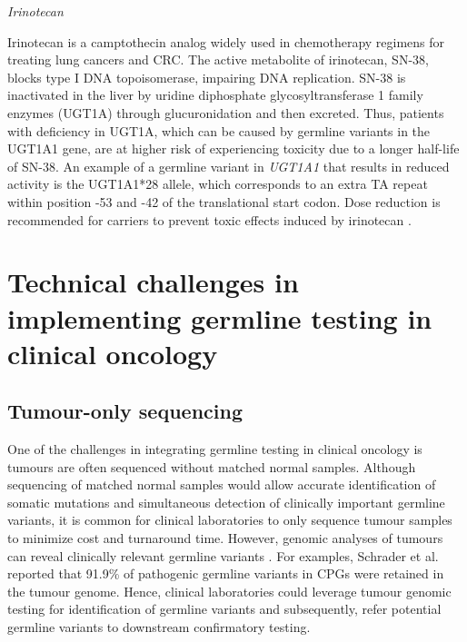 \newpage
\vspace{5mm}
\noindent\textit{Irinotecan}

Irinotecan is a camptothecin analog widely used in chemotherapy regimens for treating lung cancers and CRC. The active metabolite of irinotecan, SN-38, blocks type I DNA topoisomerase, impairing DNA replication. SN-38 is inactivated in the liver by uridine diphosphate glycosyltransferase 1 family enzymes (\acs{UGT1A}) through glucuronidation and then excreted. Thus, patients with deficiency in UGT1A, which can be caused by germline variants in the \acs{UGT1A1} gene, are at higher risk of experiencing toxicity due to a longer half-life of SN-38. An example of a germline variant in \textit{UGT1A1} that results in reduced activity is the UGT1A1*28 allele, which corresponds to an extra TA repeat within position -53 and -42 of the translational start codon. Dose reduction is recommended for carriers to prevent toxic effects induced by irinotecan \cite{Panczyk2014, Mohelnikova-Duchonova2014}.

\section{Technical challenges in implementing germline testing in clinical oncology}
\label{sec:Challengesinclinicalgermlinetesting}

\subsection{Tumour-only sequencing}

One of the challenges in integrating germline testing in clinical oncology is tumours are often sequenced without matched normal samples. Although sequencing of matched normal samples would allow accurate identification of somatic mutations and simultaneous detection of clinically important germline variants, it is common for clinical laboratories to only sequence tumour samples to minimize cost and turnaround time. However, genomic analyses of tumours can reveal clinically relevant germline variants \cite{Schrader2015, Jones2015a, Meric-Bernstam2016, Bombard2014, WcWhinney2009}. For examples, Schrader et al. \cite{Schrader2015} reported that 91.9\% of pathogenic germline variants in CPGs were retained in the tumour genome. Hence, clinical laboratories could leverage tumour genomic testing for identification of germline variants and subsequently, refer potential germline variants to downstream confirmatory testing.

